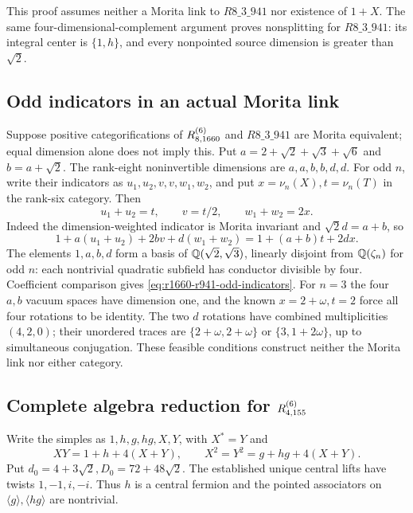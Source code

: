This proof assumes neither a Morita link to $R8\_3\_941$ nor existence
of $1+X$. The same four-dimensional-complement argument proves
nonsplitting for $R8\_3\_941$: its integral center is $\{1,h\}$, and
every nonpointed source dimension is greater than $\sqrt2$.

\subsection{Odd indicators in an actual Morita link}
Suppose positive categorifications of $R^{(6)}_{8,1660}$ and $R8\_3\_941$
are Morita equivalent; equal dimension alone does not imply this.
Put $a=2+\sqrt2+\sqrt3+\sqrt6$ and $b=a+\sqrt2$.
The rank-eight noninvertible dimensions are $a,a,b,b,d,d$.
For odd $n$, write their indicators as $u_1,u_2,v,v,w_1,w_2$, and put
$x=\nu_n(X),t=\nu_n(T)$ in the rank-six category. Then
\begin{equation}\label{eq:r1660-r941-odd-indicators}
 u_1+u_2=t,\qquad v=t/2,\qquad w_1+w_2=2x.
\end{equation}
Indeed the dimension-weighted indicator is Morita invariant and
$\sqrt2d=a+b$, so
\[
1+a(u_1+u_2)+2bv+d(w_1+w_2)=1+(a+b)t+2dx.
\]
The elements $1,a,b,d$ form a basis of $\mathbb Q(\sqrt2,\sqrt3)$, linearly
disjoint from $\mathbb Q(\zeta_n)$ for odd $n$: each nontrivial quadratic
subfield has conductor divisible by four. Coefficient comparison gives
\eqref{eq:r1660-r941-odd-indicators}.
For $n=3$ the four $a,b$ vacuum spaces have dimension one, and the known
$x=2+\omega,t=2$ force all four rotations to be identity.
The two $d$ rotations have combined multiplicities $(4,2,0)$; their
unordered traces are $\{2+\omega,2+\omega\}$ or $\{3,1+2\omega\}$,
up to simultaneous conjugation. These feasible conditions construct
neither the Morita link nor either category.

\subsection{Complete algebra reduction for $R^{(6)}_{4,155}$}
Write the simples as $1,h,g,hg,X,Y$, with $X^*=Y$ and
\[
 XY=1+h+4(X+Y),\qquad X^2=Y^2=g+hg+4(X+Y).
\]
Put $d_0=4+3\sqrt2,D_0=72+48\sqrt2$.
The established unique central lifts have twists $1,-1,i,-i$.
Thus $h$ is a central fermion and the pointed associators on
$\langle g\rangle,\langle hg\rangle$ are nontrivial.

